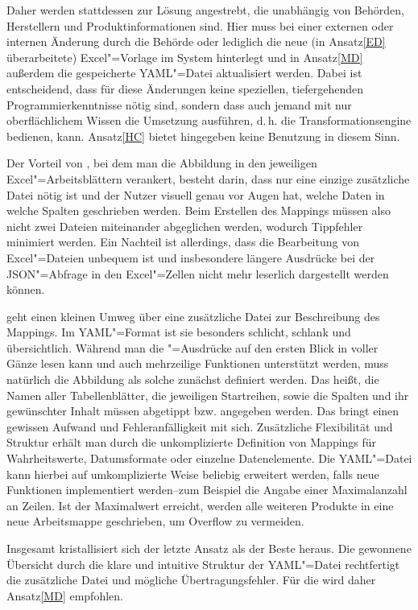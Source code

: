 Daher werden stattdessen  zur Lösung angestrebt, die unabhängig von Behörden, Herstellern und Produktinformationen sind. Hier muss bei einer externen oder internen Änderung durch die Behörde oder  lediglich die neue (in Ansatz\nbs\ref{ED} überarbeitete) Excel"=Vorlage im System hinterlegt und in Ansatz\nbs\ref{MD} außerdem die gespeicherte YAML"=Datei aktualisiert werden. Dabei ist entscheidend, dass für diese Änderungen keine speziellen, tiefergehenden Programmierkenntnisse nötig sind, sondern dass auch jemand mit nur oberflächlichem Wissen die Umsetzung ausführen, d.\,h. die Transformationsengine bedienen, kann. Ansatz\nbs\ref{HC} bietet hingegeben keine Benutzung in diesem Sinn.

Der Vorteil von , bei dem man die Abbildung in den jeweiligen Excel"=Arbeitsblättern verankert, besteht darin, dass nur eine einzige zusätzliche Datei nötig ist und der Nutzer visuell genau vor Augen hat, welche Daten in welche Spalten geschrieben werden. Beim Erstellen des Mappings müssen also nicht zwei Dateien miteinander abgeglichen werden, wodurch Tippfehler minimiert werden. Ein Nachteil ist allerdings, dass die Bearbeitung von Excel"=Dateien unbequem ist und insbesondere längere Ausdrücke bei der JSON"=Abfrage in den Excel"=Zellen nicht mehr leserlich dargestellt werden können. 

 geht einen kleinen Umweg über eine zusätzliche Datei zur Beschreibung des Mappings. Im YAML"=Format ist sie besonders schlicht, schlank und übersichtlich. Während man die "=Ausdrücke auf den ersten Blick in voller Gänze lesen kann und auch mehrzeilige Funktionen unterstützt werden, muss natürlich die Abbildung als solche zunächst definiert werden. Das heißt, die Namen aller Tabellenblätter, die jeweiligen Startreihen, sowie die Spalten und ihr gewünschter Inhalt müssen abgetippt bzw. angegeben werden. Das bringt einen gewissen Aufwand und Fehleranfälligkeit mit sich. Zusätzliche Flexibilität und Struktur erhält man durch die unkomplizierte Definition von Mappings für Wahrheitswerte, Datumsformate oder einzelne Datenelemente. Die YAML"=Datei kann hierbei auf umkomplizierte Weise beliebig erweitert werden, falls neue Funktionen implementiert werden\nbs --\nbs zum Beispiel die Angabe einer Maximalanzahl an Zeilen. Ist der Maximalwert erreicht, werden alle weiteren Produkte in eine neue Arbeitsmappe geschrieben, um Overflow zu vermeiden.

\enlargethispage{\baselineskip}
Insgesamt kristallisiert sich der letzte Ansatz als der Beste heraus. Die gewonnene Übersicht durch die klare und intuitive Struktur der YAML"=Datei rechtfertigt die zusätzliche Datei und mögliche Übertragungsfehler. Für die  wird daher Ansatz\nbs\ref{MD} empfohlen. 

